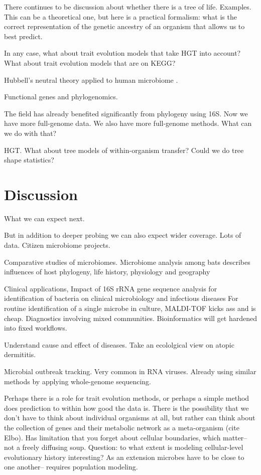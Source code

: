 \documentclass{amsart}
\begin{document}
There continues to be discussion about whether there is a tree of life.
Examples.
This can be a theoretical one, but here is a practical formalism: what is the correct representation of the genetic ancestry of an organism that allows us to best predict.

In any case, what about trait evolution models that take HGT into account?
What about trait evolution models that are on KEGG?

Hubbell's neutral theory applied to human microbiome \cite{fierer2012animalcules,costello2012application}.

Functional genes and phylogenomics.

The field has already benefited significantly from phylogeny using 16S.
Now we have more full-genome data.
We also have more full-genome methods.
What can we do with that?

HGT.
What about tree models of within-organism transfer?
Could we do tree shape statistics?


\section{Discussion}
What we can expect next.

But in addition to deeper probing we can also expect wider coverage.
Lots of data.
Citizen microbiome projects.

Comparative studies of microbiomes.
\cite{phillips2012microbiome}
Microbiome analysis among bats describes influences of host phylogeny, life history, physiology and geography

Clinical applications,
\cite{clarridge2004}
{{I}mpact of 16{S} r{RNA} gene sequence analysis for identification of bacteria on clinical microbiology and infectious diseases}
For routine identification of a single microbe in culture, MALDI-TOF kicks ass and is cheap.
Diagnostics involving mixed communities.
Bioinformatics will get hardened into fixed workflows.

Understand cause and effect of diseases.
Take an ecololgical view on atopic dermititis.

Microbial outbreak tracking.
Very common in RNA viruses.
Already using similar methods by applying whole-genome sequencing.

Perhaps there is a role for trait evolution methods, or perhaps a simple method does prediction to within how good the data is.
There is the possibility that we don't have to think about individual organisms at all, but rather can think about the collection of genes and their metabolic network as a meta-organism (cite Elbo).
Has limitation that you forget about cellular boundaries, which matter-- not a freely diffusing soup.
Question: to what extent is modeling cellular-level evolutionary history interesting?
As an extension microbes have to be close to one another-- requires population modeling.
\end{document}
